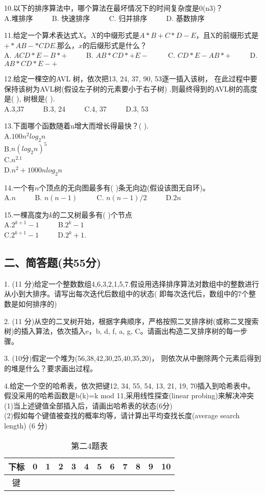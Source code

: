 10.以下的排序算法中，哪个算法在最坏情况下的时间复杂度是0(n3)？ \\
A.堆排序  $\qquad$ B. 快速排序  $\qquad$ C. 归并排序 $\qquad$ D. 基数排序

11.给定一个算术表达式$X$。$X$的中缀形式是$A*B+C*D-E$，且X的前缀形式是$+*AB-*CDE$.那么，$x$的后缀形式是什么？ \\
A. $ACD*E-B*+$ $\qquad$ B. $AB*CD*+E-$ $\qquad$ C. $CD*E-AB*+$ $\qquad$ D. $AB*CD*E-+$

12.给定一棵空的AVL 树，依次把13, 24, 37, 90, 53逐一插入该树， 在此过程中要保持该树为AVL树(假设左子树的元素要小于右子树) .则最终得到的AVL树的高度是( ), 树根是( ). \\
A.3,37 $\qquad$ B.3, 24 $\qquad$ C.4, 37 $\qquad$ D.3, 53

13.下面哪个函数随着n增大而增长得最快？( ). \\
A.$100n^2log_2n$ \\
B.$n(log_2n)^5$ \\
C.$n^{2.1}$ \\
D.$n^2+1000nlog_2n$

14.一个有$n$个顶点的无向图最多有( )条无向边(假设该图无自环)。 \\
A.$n$ $\qquad$ B. $n(n-1)$ $\qquad$ C. $n(n-1)/2$ $\qquad$ D.$2n$

15.一棵高度为$k$的二又树最多有( )个节点 \\
A.$2^{k+1}-1$ $\qquad$ B.$2^k-1$ \\
C.$2^{k+1}-1$ $\qquad$ D.$2^k+1$.

\subsection{二、简答题(共55分)}
1. (11 分)给定一个整数数组{4,6,3,2,1,5,7}.假设用选择排序算法对数组中的整数进行从小到大排序。请写出每次迭代后数组中的状态( 即每次迭代后，数组中的7个整数是如何排序的)

2. (11 分)从空的二叉树开始，根据字典顺序，严格按照二叉排序树(或称二叉搜索树)的插入算法，依次插入e，b, d, f, a, g, C。请画出构造二叉排序树的每一步骤。

3. (10分)假定一个堆为(56,38,42,30,25,40,35,20)， 则依次从中删除两个元素后得到的堆是什么？要求画出过程。

4.给定一个空的哈希表，依次把键12, 34, 55, 54, 13, 21, 19, 70插入到哈希表中。假没采用的哈希函数是b(k)=k mod 11,采用线性探查(linear probing)来解决冲突 \\
(1)当上述键值全部插入后，请画出哈希表的状态(6分) \\
(2)假如每个键值被查找的概率均等，请计算出平均查找长度(average search length) (6 分)
\begin{table}[ht]
\centering
\caption{第二4题表}\label{tab_SYDS15_1}
\begin{tabular}{|c|c|c|c|c|c|c|c|c|c|c|c|}
\hline
下标 & 0 & 1 & 2 & 3 & 4 & 5 & 6 & 7 & 8 & 9 & 10 \\
\hline
键 &  &  &  &  &  &  &  &  &  &  & \\
\hline
\end{tabular}
\end{table}

